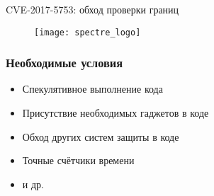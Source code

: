 \begin{frame}{\insertsubsection}

  CVE-2017-5753: обход проверки границ

  \begin{figure}[h]
    \texttt{[image: spectre\_logo]}
  \end{figure}

  \note{


  }
\end{frame}

\subsubsection{Необходимые условия}
\begin{frame}{\insertsubsubsection}
  \begin{itemize}
  \item Спекулятивное выполнение кода
  \item Присутствие необходимых гаджетов в коде
  \item Обход других систем защиты в коде
  \item Точные счётчики времени
  \item и др.
  \end{itemize}

\end{frame}


